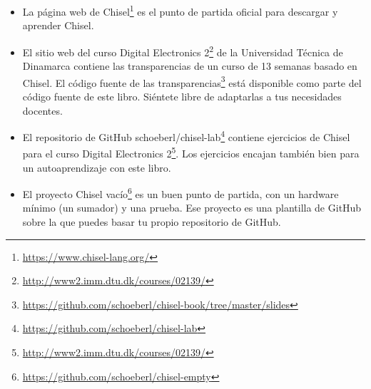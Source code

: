 \documentclass[%
    10pt,
    headinclude, footinclude=false,
    openright, %
    notitlepage,
    cleardoublepage=empty,
    headsepline,
    numbers=noenddot,
    bibliography=totoc, index=totoc,
    ]{scrbook}
\newcommand{\myref}[2]{\href{#1}{#2}}
\renewcommand{\myref}[2]{{#2}{\footnote{\url{#1}}}}
\begin{document}
\begin{itemize}
\item La página web de \myref{https://www.chisel-lang.org/}{Chisel} es el punto de partida oficial para
descargar y aprender Chisel.

\item El sitio web del curso \myref{http://www2.imm.dtu.dk/courses/02139/}{Digital Electronics 2}
de la Universidad Técnica de Dinamarca contiene las transparencias de un curso de 13 semanas basado en Chisel.
El código fuente de las \myref{https://github.com/schoeberl/chisel-book/tree/master/slides}{transparencias}
está disponible como parte del código fuente de este libro. Siéntete libre de adaptarlas a tus necesidades docentes.

\item El repositorio de GitHub \myref{https://github.com/schoeberl/chisel-lab}{schoeberl/chisel-lab}
contiene ejercicios de Chisel para el curso \myref{http://www2.imm.dtu.dk/courses/02139/}{Digital Electronics 2}.
Los ejercicios encajan también bien para un autoaprendizaje con este libro.


\item El \myref{https://github.com/schoeberl/chisel-empty}{proyecto Chisel vacío} es un buen punto de
partida, con un hardware mínimo (un sumador) y una prueba. Ese proyecto es una plantilla de GitHub sobre
la que puedes basar tu propio repositorio de GitHub.


\end{itemize}
\end{document}
